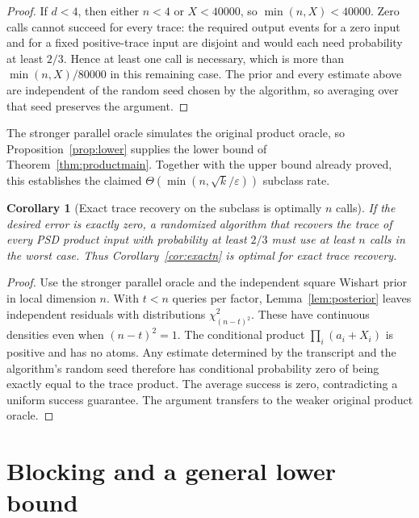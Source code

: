 \documentclass[11pt]{article}
\newtheorem{corollary}[theorem]{Corollary}
\theoremstyle{definition}\newtheorem{definition}[theorem]{Definition}
\theoremstyle{remark}\newtheorem{remark}[theorem]{Remark}
\newcommand{\eps}{\varepsilon}\newcommand{\Qprod}{Q_{\mathrm{prod}}}
\begin{document}
\begin{proof}
If $d<4$, then either $n<4$ or $X<40000$, so $\min(n,X)<40000$.
Zero calls cannot succeed for every trace: the required output events for a
zero input and for a fixed positive-trace input are disjoint and would each
need probability at least $2/3$. Hence at least one call is necessary, which is
more than $\min(n,X)/80000$ in this remaining case.
The prior and every estimate above are independent of the random seed chosen
by the algorithm, so averaging over that seed preserves the argument.
\end{proof}

The stronger parallel oracle simulates the original product oracle, so
Proposition~\ref{prop:lower} supplies the lower bound of
Theorem~\ref{thm:productmain}. Together with the upper bound already proved,
this establishes the claimed $\Theta(\min(n,\sqrt k/\eps))$ subclass rate.


\begin{corollary}[Exact trace recovery on the subclass is optimally $n$ calls]
If the desired error is exactly zero, a randomized algorithm that recovers the
trace of every PSD product input with probability at least $2/3$ must use at
least $n$ calls in the worst case. Thus Corollary~\ref{cor:exactn} is optimal
for exact trace recovery.
\end{corollary}
\begin{proof}
Use the stronger parallel oracle and the independent square Wishart prior in
local dimension $n$. With $t<n$ queries per factor, Lemma~\ref{lem:posterior}
leaves independent residuals with distributions $\chi^2_{(n-t)^2}$.
These have continuous densities even when $(n-t)^2=1$. The conditional product
$\prod_i(a_i+X_i)$ is positive and has no atoms. Any estimate determined by the
transcript and the algorithm's random seed therefore has conditional probability
zero of being exactly equal to the trace product. The average success is zero,
contradicting a uniform success guarantee. The argument transfers to the weaker
original product oracle.
\end{proof}

\section{Blocking and a general lower bound}
\label{sec:blocking}
\end{document}
